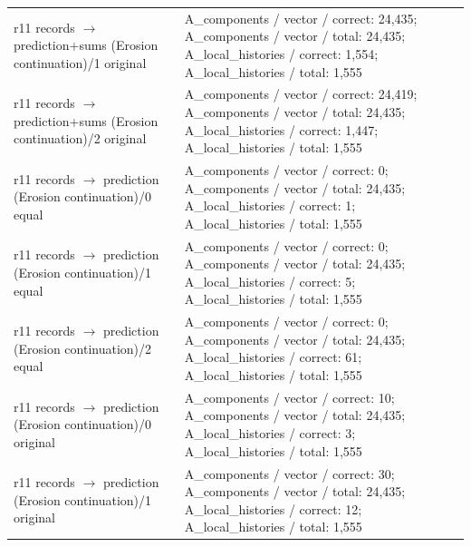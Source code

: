 \begin{longtable}{@{}>{\raggedright\arraybackslash}p{1.800in}>{\raggedright\arraybackslash}p{4.200in}@{}}
r11 records $\to$ prediction+sums (Erosion continuation)/\allowbreak{}1 original & A\_\allowbreak{}components /\allowbreak{} vector /\allowbreak{} correct: 24,435; A\_\allowbreak{}components /\allowbreak{} vector /\allowbreak{} total: 24,435; A\_\allowbreak{}local\_\allowbreak{}histories /\allowbreak{} correct: 1,554; A\_\allowbreak{}local\_\allowbreak{}histories /\allowbreak{} total: 1,555 \\
r11 records $\to$ prediction+sums (Erosion continuation)/\allowbreak{}2 original & A\_\allowbreak{}components /\allowbreak{} vector /\allowbreak{} correct: 24,419; A\_\allowbreak{}components /\allowbreak{} vector /\allowbreak{} total: 24,435; A\_\allowbreak{}local\_\allowbreak{}histories /\allowbreak{} correct: 1,447; A\_\allowbreak{}local\_\allowbreak{}histories /\allowbreak{} total: 1,555 \\
r11 records $\to$ prediction (Erosion continuation)/\allowbreak{}0 equal & A\_\allowbreak{}components /\allowbreak{} vector /\allowbreak{} correct: 0; A\_\allowbreak{}components /\allowbreak{} vector /\allowbreak{} total: 24,435; A\_\allowbreak{}local\_\allowbreak{}histories /\allowbreak{} correct: 1; A\_\allowbreak{}local\_\allowbreak{}histories /\allowbreak{} total: 1,555 \\
r11 records $\to$ prediction (Erosion continuation)/\allowbreak{}1 equal & A\_\allowbreak{}components /\allowbreak{} vector /\allowbreak{} correct: 0; A\_\allowbreak{}components /\allowbreak{} vector /\allowbreak{} total: 24,435; A\_\allowbreak{}local\_\allowbreak{}histories /\allowbreak{} correct: 5; A\_\allowbreak{}local\_\allowbreak{}histories /\allowbreak{} total: 1,555 \\
r11 records $\to$ prediction (Erosion continuation)/\allowbreak{}2 equal & A\_\allowbreak{}components /\allowbreak{} vector /\allowbreak{} correct: 0; A\_\allowbreak{}components /\allowbreak{} vector /\allowbreak{} total: 24,435; A\_\allowbreak{}local\_\allowbreak{}histories /\allowbreak{} correct: 61; A\_\allowbreak{}local\_\allowbreak{}histories /\allowbreak{} total: 1,555 \\
r11 records $\to$ prediction (Erosion continuation)/\allowbreak{}0 original & A\_\allowbreak{}components /\allowbreak{} vector /\allowbreak{} correct: 10; A\_\allowbreak{}components /\allowbreak{} vector /\allowbreak{} total: 24,435; A\_\allowbreak{}local\_\allowbreak{}histories /\allowbreak{} correct: 3; A\_\allowbreak{}local\_\allowbreak{}histories /\allowbreak{} total: 1,555 \\
r11 records $\to$ prediction (Erosion continuation)/\allowbreak{}1 original & A\_\allowbreak{}components /\allowbreak{} vector /\allowbreak{} correct: 30; A\_\allowbreak{}components /\allowbreak{} vector /\allowbreak{} total: 24,435; A\_\allowbreak{}local\_\allowbreak{}histories /\allowbreak{} correct: 12; A\_\allowbreak{}local\_\allowbreak{}histories /\allowbreak{} total: 1,555 \\

\end{longtable}
